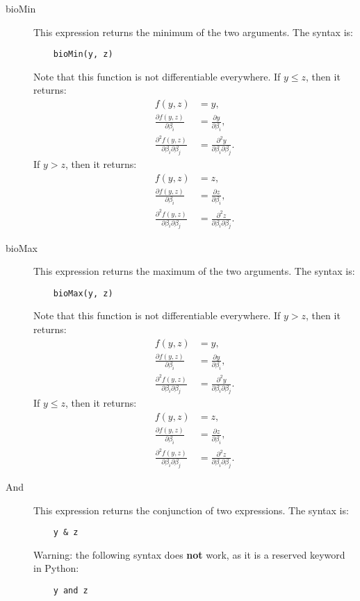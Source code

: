 \documentclass[12pt,a4paper]{article}
\begin{document}
\begin{description}
\item[bioMin]  This expression returns the minimum of the two arguments. The syntax is: 
  \begin{lstlisting}
    bioMin(y, z)
  \end{lstlisting}
  Note that this function is not differentiable everywhere. 
  If $y \leq z$, then it returns:
  \begin{align*}
    f(y, z) &=y,  \\
    \frac{\partial f(y, z)}{\partial \beta_i} &= \frac{\partial y}{\partial \beta_i},    \\
    \frac{\partial^2 f(y, z)}{\partial \beta_i \partial \beta_j} &= \frac{\partial^2 y}{\partial \beta_i \partial \beta_j}.
  \end{align*}
  If $y > z$, then it returns:
  \begin{align*}
    f(y, z) &=z,  \\
    \frac{\partial f(y, z)}{\partial \beta_i} &= \frac{\partial z}{\partial \beta_i},    \\
    \frac{\partial^2 f(y, z)}{\partial \beta_i \partial \beta_j} &= \frac{\partial^2 z}{\partial \beta_i \partial \beta_j}.
  \end{align*}
  
\item[bioMax]  This expression returns the maximum of the two arguments. The syntax is: 
  \begin{lstlisting}
    bioMax(y, z)
  \end{lstlisting}
  Note that this function is not differentiable everywhere. 
  If $y > z$, then it returns:
  \begin{align*}
    f(y, z) &=y,  \\
    \frac{\partial f(y, z)}{\partial \beta_i} &= \frac{\partial y}{\partial \beta_i},    \\
    \frac{\partial^2 f(y, z)}{\partial \beta_i \partial \beta_j} &= \frac{\partial^2 y}{\partial \beta_i \partial \beta_j}.
  \end{align*}
  If $y \leq z$, then it returns:
  \begin{align*}
    f(y, z) &=z,  \\
    \frac{\partial f(y, z)}{\partial \beta_i} &= \frac{\partial z}{\partial \beta_i},    \\
    \frac{\partial^2 f(y, z)}{\partial \beta_i \partial \beta_j} &= \frac{\partial^2 z}{\partial \beta_i \partial \beta_j}.
  \end{align*}

\item[And]   This expression returns the conjunction of two expressions. The syntax is:
    \begin{lstlisting}
    y & z 
    \end{lstlisting}
    Warning: the following syntax does \textbf{not} work, as it is a reserved keyword in Python:
    \begin{lstlisting}
    y and z 
    \end{lstlisting}
    

\end{description}
\end{document}
